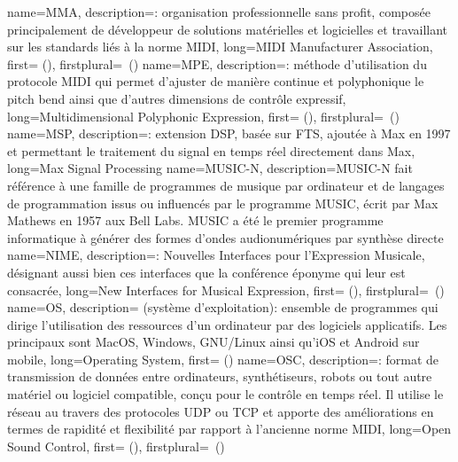 {
    name={MMA},
    description={\textit{}: organisation professionnelle sans profit, composée principalement de développeur de solutions matérielles et logicielles et travaillant sur les standards liés à la norme MIDI},
    long={MIDI Manufacturer Association},
    first={ ()},
    firstplural={\glspluralsuffix\ (\glspluralsuffix)}
}
{
    name={MPE},
    description={\textit{}: méthode d'utilisation du protocole MIDI qui permet d'ajuster de manière continue et polyphonique le pitch bend ainsi que d'autres dimensions de contrôle expressif},
    long={Multidimensional Polyphonic Expression},
   	first={ ()},
    firstplural={\glspluralsuffix\ (\glspluralsuffix)}
}
{
    name={MSP},
    description={\textit{}: extension \gls{DSP}, basée sur \gls{FTS}, ajoutée à Max en 1997 et permettant le traitement du signal en temps réel directement dans Max},
    long={Max Signal Processing}
}
{
    name={MUSIC-N},
    description={MUSIC-N fait référence à une famille de programmes de musique par ordinateur et de langages de programmation issus ou influencés par le programme MUSIC, écrit par Max Mathews en 1957 aux Bell Labs. MUSIC a été le premier programme informatique à générer des formes d'ondes audionumériques par synthèse directe}
}
{
    name={NIME},
    description={\textit{}: Nouvelles Interfaces pour l'Expression Musicale, désignant aussi bien ces interfaces que la conférence éponyme qui leur est consacrée},
    long={New Interfaces for Musical Expression},
    first={ ()},
    firstplural={\glspluralsuffix\ (\glspluralsuffix)}
}
{
    name={OS},
    description={\textit{} (système d'exploitation): ensemble de programmes qui dirige l'utilisation des ressources d'un ordinateur par des logiciels applicatifs. Les principaux sont MacOS, Windows, GNU/Linux ainsi qu'iOS et Android sur mobile},
    long={Operating System},
    first={ ()}
}
{
    name={OSC},
    description={\textit{}: format de transmission de données entre ordinateurs, synthétiseurs, robots ou tout autre matériel ou logiciel compatible, conçu pour le contrôle en temps réel. Il utilise le réseau au travers des protocoles \gls{UDP} ou \gls{TCP} et apporte des améliorations en termes de rapidité et flexibilité par rapport à l'ancienne norme MIDI},
    long={Open Sound Control},
    first={ ()},
    firstplural={\glspluralsuffix\ (\glspluralsuffix)}
}

